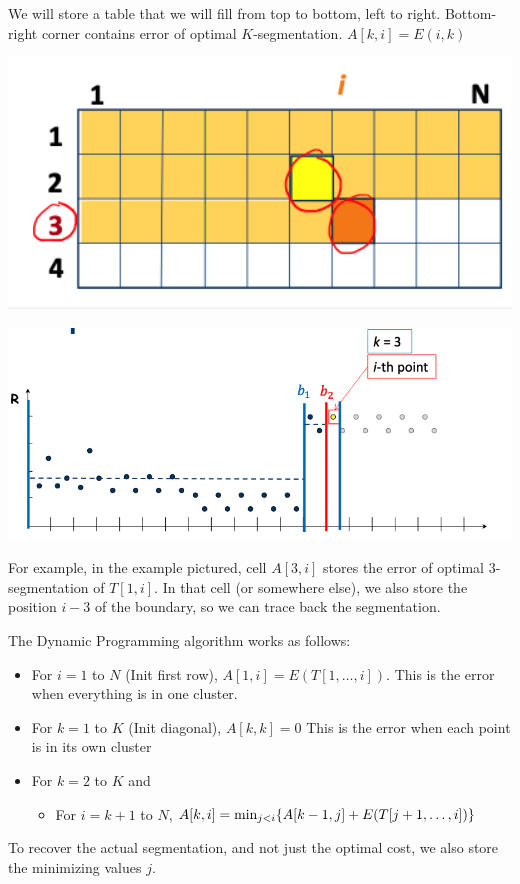         We will store a table that we will fill from top to bottom, left to right. Bottom-right corner contains error of optimal $K$-segmentation. $A[k, i] = E(i, k)$
        
        \begin{center}
            \includegraphics[width=1\textwidth]{images/table.png}
        \end{center}
         \begin{center}
            \includegraphics[width=1\textwidth]{images/placingk.png}
        \end{center}
        
        For example, in the example pictured, cell $A[3, i]$ stores the error of optimal $3$-segmentation of $T[1, i]$. In that cell (or somewhere else), we also store the position $i-3$ of the boundary, so we can trace back the segmentation. 
        
        The Dynamic Programming algorithm works as follows:
        \begin{itemize}
            \item For $i = 1$ to $N$ (Init first row), $A[1, i] = E(T[1, \dots, i])$. This is the error when everything is in one cluster.
            \item For $k = 1$ to $K$ (Init diagonal), $A[k, k] = 0$ This is the error when each point is in its own cluster
            \item For $k=2$ to $K$ and \begin{itemize}
                \item For $i = k + 1$ to $N$, $A[k, i] = \min_{j < i}\{A[k-1, j] + E(T[j+1, \dots, i])\}$
            \end{itemize}
        \end{itemize}
        To recover the actual segmentation, and not just the optimal cost, we also store the minimizing values $j$. 
        
